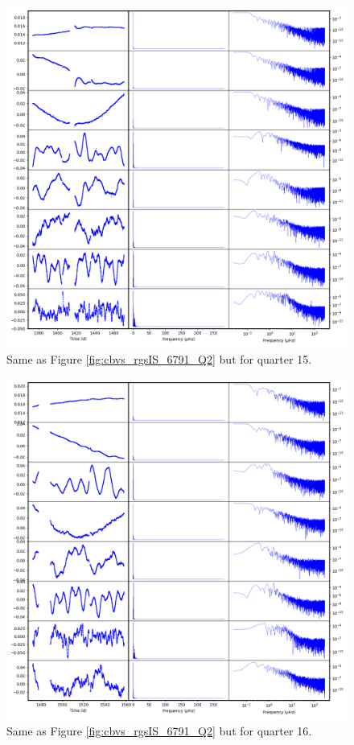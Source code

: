 \begin{figure}
    \centering
    \includegraphics[width=\linewidth]{Chapter_Appended/AppB/cbv_6791_rgs_q15.png}
    \caption{Same as Figure \ref{fig:cbvs_rgsIS_6791_Q2} but for quarter 15.}
    \label{fig:cbvs_rgsIS_6791_Q15}
\end{figure}


\begin{figure}
    \centering
    \includegraphics[width=\linewidth]{Chapter_Appended/AppB/cbv_6791_rgs_q16.png}
    \caption{Same as Figure \ref{fig:cbvs_rgsIS_6791_Q2} but for quarter 16.}
    \label{fig:cbvs_rgsIS_6791_Q16}
\end{figure}


